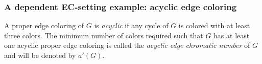 \documentclass[11pt]{article}
\let\\=\noindent
\def\vv{\vskip.2cm}
\begin{document}
%
%

\subsubsection{A dependent EC-setting example: acyclic edge coloring}\label{subacy}
A proper edge coloring of $G$ is \textit{acyclic} if any cycle of $G$ is colored with at least three colors.
The minimum number of colors required such that  $G$ has at least one acyclic proper edge coloring is called
the {\it acyclic edge chromatic number} of $G$  and will be denoted by $a'(G)$.
\end{document}
